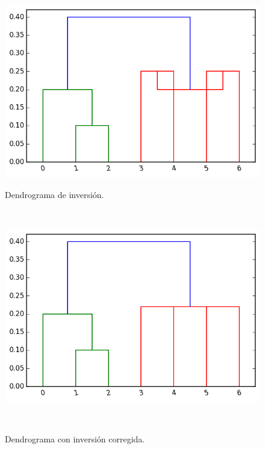 \begin{figure}[h!]
                                                                                                                        
\begin{minipage}[b]{0.49\textwidth}
    \includegraphics[width=\textwidth]{img/inversion_0.png}
    \caption{\small Dendrograma de inversi\'on.}
     \label{fig:inversion}
\end{minipage} ~
\hfill
\begin{minipage}[b]{0.49\textwidth}
    \includegraphics[width=\textwidth]{img/inversion_1.png}
    \caption{\small Dendrograma con inversi\'on corregida. }
    \label{fig:no_inversion}
\end{minipage} ~

\end{figure}  

